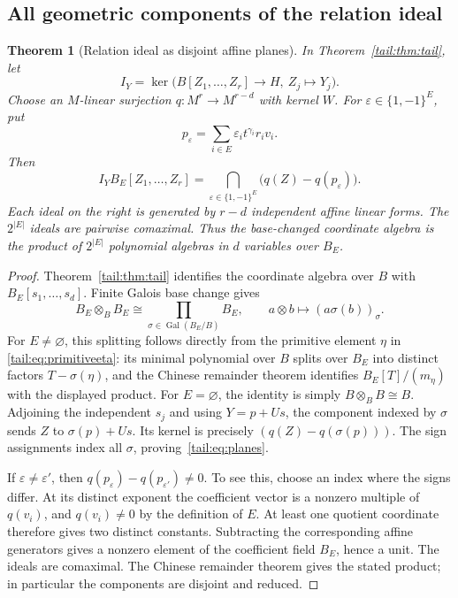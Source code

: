 \documentclass[11pt,a4paper]{article}
\numberwithin{equation}{section}
\newtheorem{theorem}{Theorem}[section]
\theoremstyle{definition}
\theoremstyle{remark}
\newcommand{\Gal}{\operatorname{Gal}}
\begin{document}
\subsection{All geometric components of the relation ideal}
\begin{theorem}[Relation ideal as disjoint affine planes]\label{tail:thm:planes}
In Theorem~\ref{tail:thm:tail}, let
\[
 I_Y=\ker\bigl(B[Z_1,\ldots,Z_r]\longrightarrow H,
                     \ Z_j\longmapsto Y_j\bigr).
\]
Choose an $M$-linear surjection $q:M^r\to M^{r-d}$ with kernel $W$.
For $\varepsilon\in\{1,-1\}^E$, put
\[
 p_\varepsilon=\sum_{i\in E}
                 \varepsilon_i t^{\gamma_i}r_iv_i.
\]
Then
\begin{equation}\label{tail:eq:planes}
 I_YB_E[Z_1,\ldots,Z_r]
   =\bigcap_{\varepsilon\in\{1,-1\}^E}
                 \bigl(q(Z)-q(p_\varepsilon)\bigr).
\end{equation}
Each ideal on the right is generated by $r-d$ independent affine linear
forms. The $2^{|E|}$ ideals are pairwise comaximal. Thus the base-changed
coordinate algebra is the product of $2^{|E|}$ polynomial algebras in
$d$ variables over $B_E$.
\end{theorem}
\begin{proof}
Theorem~\ref{tail:thm:tail} identifies the coordinate algebra over $B$ with
$B_E[s_1,\ldots,s_d]$. Finite Galois base change gives
\[
 B_E\otimes_B B_E\cong
       \prod_{\sigma\in\Gal(B_E/B)}B_E,
 \qquad a\otimes b\longmapsto(a\sigma(b))_\sigma.
\]
For $E\ne\varnothing$, this splitting follows directly from the primitive
element $\eta$ in \eqref{tail:eq:primitiveeta}: its minimal polynomial over
$B$ splits over $B_E$ into distinct factors $T-\sigma(\eta)$, and the
Chinese remainder theorem identifies $B_E[T]/(m_\eta)$ with the displayed
product. For $E=\varnothing$, the identity is simply $B\otimes_B B\cong B$.
Adjoining the independent $s_j$ and using $Y=p+Us$, the component indexed
by $\sigma$ sends $Z$ to $\sigma(p)+Us$. Its kernel is precisely
$(q(Z)-q(\sigma(p)))$. The sign assignments index all $\sigma$,
proving~\eqref{tail:eq:planes}.

If $\varepsilon\ne\varepsilon'$, then
$q(p_\varepsilon)-q(p_{\varepsilon'})\ne0$. To see this, choose an index
where the signs differ. At its distinct exponent the coefficient vector
is a nonzero multiple of $q(v_i)$, and $q(v_i)\ne0$ by the definition of
$E$. At least one quotient coordinate therefore gives two distinct
constants. Subtracting the corresponding affine generators gives a
nonzero element of the coefficient field $B_E$, hence a unit. The ideals
are comaximal. The Chinese remainder theorem gives the stated product;
in particular the components are disjoint and reduced.
\end{proof}
\end{document}
